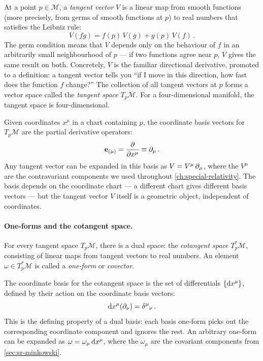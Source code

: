 At a point $p \in \mathcal{M}$, a \emph{tangent vector} $V$ is a linear map
from smooth functions (more precisely, from germs of smooth functions at $p$)
to real numbers that satisfies the Leibniz rule:
%
\begin{equation}
  V(fg) = f(p)\,V(g) + g(p)\,V(f) \,.
  \label{eq:tangent-vector-leibniz}
\end{equation}
%
The germ condition means that $V$ depends only on the behaviour of $f$ in an
arbitrarily small neighbourhood of $p$ --- if two functions agree near $p$,
$V$ gives the same result on both.  Concretely, $V$ is the familiar
directional derivative, promoted to a definition: a tangent vector tells you
``if I move in this direction, how fast does the function $f$ change?''  The
collection of all tangent vectors at $p$ forms a vector space called the
\emph{tangent space} $T_p\mathcal{M}$.  For a four-dimensional manifold, the
tangent space is four-dimensional.

Given coordinates $x^\mu$ in a chart containing $p$, the coordinate basis
vectors for $T_p\mathcal{M}$ are the partial derivative operators:
%
\begin{equation}
  \mathbf{e}_{(\mu)} = \frac{\partial}{\partial x^\mu}
    \equiv \partial_{\mu} \,.
  \label{eq:coordinate-basis}
\end{equation}
%
Any tangent vector can be expanded in this basis as $V = V^\mu\,\partial_{\mu}$,
where the $V^\mu$ are the contravariant components we used throughout
\cref{ch:special-relativity}.  The basis depends on the coordinate chart --- a
different chart gives different basis vectors --- but the tangent vector $V$
itself is a geometric object, independent of coordinates.

\paragraph{One-forms and the cotangent space.}

For every tangent space $T_p\mathcal{M}$, there is a dual space: the
\emph{cotangent space} $T^*_p\mathcal{M}$, consisting of linear maps from
tangent vectors to real numbers.  An element $\omega \in T^*_p\mathcal{M}$ is
called a \emph{one-form} or \emph{covector}.

The coordinate basis for the cotangent space is the set of differentials
$\{\mathrm{d} x^\mu\}$, defined by their action on the coordinate basis vectors:
%
\begin{equation}
  \mathrm{d} x^\mu(\partial_{\nu}) = \delta^\mu{}_\nu \,.
  \label{eq:dual-basis}
\end{equation}
%
This is the defining property of a dual basis: each basis one-form picks out
the corresponding coordinate component and ignores the rest.  An arbitrary
one-form can be expanded as $\omega = \omega_\mu\,\mathrm{d} x^\mu$, where the
$\omega_\mu$ are the covariant components from \cref{sec:sr-minkowski}.

